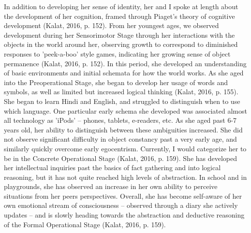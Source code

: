 \documentclass[a4paper, 10pt]{article}
\begin{document}
	In addition to developing her sense of identity, her and I spoke at length about the development of her cognition, framed through Piaget's theory of cognitive development (Kalat, 2016, p. 152). From her youngest ages, we observed development during her Sensorimotor Stage through her interactions with the objects in the world around her, observing growth to correspond to diminished responses to 'peek-a-boo' style games, indicating her growing sense of object permanence (Kalat, 2016, p. 152). In this period, she developed an understanding of basic environments and initial schemata for how the world works. As she aged into the Preoperational Stage, she began to develop her usage of words and symbols, as well as limited but increased logical thinking (Kalat, 2016, p. 155). She began to learn Hindi and English, and struggled to distinguish when to use which language. One particular early schema she developed was associated almost all technology as 'iPods' – phones, tablets, e-readers, etc. As she aged past 6-7 years old, her ability to distinguish between these ambiguities increased. She did not observe significant difficulty in object constancy past a very early age, and similarly quickly overcome early egocentrism. Currently, I would categorize her to be in the Concrete Operational Stage (Kalat, 2016, p. 159). She has developed her intellectual inquiries past the basics of fact gathering and into logical reasoning, but it has not quite reached high levels of abstraction. In school and in playgrounds, she has observed an increase in her own ability to perceive situations from her peers perspectives. Overall, she has become self-aware of her own emotional stream of consciousness – observed through a diary she actively updates – and is slowly heading towards the abstraction and deductive reasoning of the Formal Operational Stage (Kalat, 2016, p. 159).
	
\end{document}
